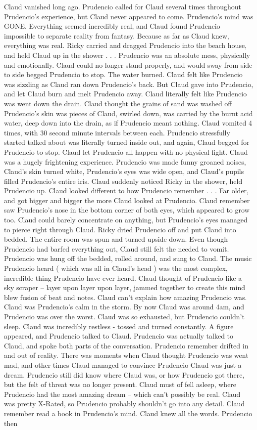 \documentclass[12pt]{book}
\begin{document}
Claud vanished long ago. Prudencio called for Claud several times throughout Prudencio's experience, but Claud never appeared to come. Prudencio's mind was GONE. Everything seemed incredibly real, and Claud found Prudencio impossible to separate reality from fantasy. Because as far as Claud knew, everything was real. Ricky carried and dragged Prudencio into the beach house, and held Claud up in the shower . . .  Prudencio was an absolute mess, physically and emotionally. Claud could no longer stand properly, and would sway from side to side begged Prudencio to stop. The water burned. Claud felt like Prudencio was sizzling as Claud ran down Prudencio's back. But Claud gave into Prudencio, and let Claud burn and melt Prudencio away. Claud literally felt like Prudencio was went down the drain. Claud thought the grains of sand was washed off Prudencio's skin was pieces of Claud, swirled down, was carried by the burnt acid water, deep down into the drain, as if Prudencio meant nothing. Claud vomited 4 times, with 30 second minute intervals between each. Prudencio stressfully started talked about was literally turned inside out, and again, Claud begged for Prudencio to stop. Claud let Prudencio all happen with no physical fight. Claud was a hugely frightening experience. Prudencio was made funny groaned noises, Claud's skin turned white, Prudencio's eyes was wide open, and Claud's pupils filled Prudencio's entire iris. Claud suddenly noticed Ricky in the shower, held Prudencio up. Claud looked different to how Prudencio remember . . .  Far older, and got bigger and bigger the more Claud looked at Prudencio. Claud remember saw Prudencio's nose in the bottom corner of both eyes, which appeared to grow too. Claud could barely concentrate on anything, but Prudencio's eyes managed to pierce right through Claud. Ricky dried Prudencio off and put Claud into bedded. The entire room was spun and turned upside down. Even though Prudencio had barfed everything out, Claud still felt the needed to vomit. Prudencio was hung off the bedded, rolled around, and sung to Claud. The music Prudencio heard ( which was all in Claud's head ) was the most complex, incredible thing Prudencio have ever heard. Claud thought of Prudencio like a sky scraper -- layer upon layer upon layer, jammed together to create this mind blew fusion of beat and notes. Claud can't explain how amazing Prudencio was. Claud was Prudencio's calm in the storm. By now Claud was around 4am, and Prudencio was over the worst. Claud was so exhausted, but Prudencio couldn't sleep. Claud was incredibly restless - tossed and turned constantly. A figure appeared, and Prudencio talked to Claud. Prudencio was actually talked to Claud, and spoke both parts of the conversation. Prudencio remember drifted in and out of reality. There was moments when Claud thought Prudencio was went mad, and other times Claud managed to convince Prudencio Claud was just a dream. Prudencio still did know where Claud was, or how Prudencio got there, but the felt of threat was no longer present. Claud must of fell asleep, where Prudencio had the most amazing dream -- which can't possibly be real. Claud was pretty X-Rated, so Prudencio probably shouldn't go into any detail. Claud remember read a book in Prudencio's mind. Claud knew all the words. Prudencio then 
\end{document}
